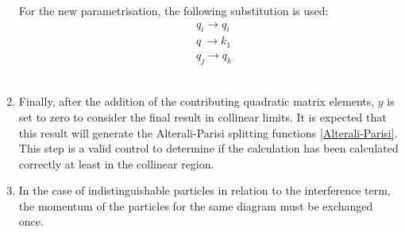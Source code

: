 \begin{enumerate}
For the new parametrisation, the following substitution is used:
\begin{equation}
\begin{split}
&q_i \rightarrow q_i\\
&q \: \rightarrow k_1\\
&q_j \rightarrow q_k
\end{split}
\end{equation}
\\
\item Finally, after the addition of the contributing quadratic matrix elements, $y$ is set to zero to consider the final result in collinear limits. It is expected that this result will generate the Alterali-Parisi splitting functions \ref{Alterali-Parisi}. This step is a valid control to determine if the calculation has been calculated correctly at least in the collinear region.
\\
\item In the case of indistinguishable particles in relation to the interference term, the momentum of the particles for the same diagram must be exchanged once.
\end{enumerate}
